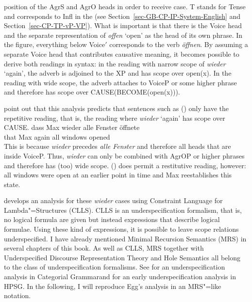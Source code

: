 position of the AgrS and AgrO heads in order to receive case.
T stands for Tense and corresponds to Infl in the \gbt (see
Section~\ref{sec-GB-CP-IP-System-English} and Section~\ref{sec-CP-TP-vP-VP}). 
What is important is that there is the Voice head and the separate representation of \emph{offen} `open' as the head of its
own phrase. In the figure, everything below Voice$'$ corresponds to the verb \emph{öffnen}. By assuming a separate Voice head that
contributes causative meaning, it becomes possible to derive both readings in syntax: in the reading with narrow scope of \emph{wieder} `again',
the adverb is adjoined to the XP and has scope over open(x). In the reading with wide scope, the adverb attaches to VoiceP or some higher phrase
and therefore has scope over CAUSE(BECOME(open(x))).

\citet{JB2003a-u} point out that this analysis predicts that sentences such as () only have the repetitive reading, that is, the reading where 
\emph{wieder} `again' has scope over CAUSE.
\ea
\label{ex-wieder-alle}
\gll dass Max wieder alle Fenster öffnete\\
     that Max again all windows opened\\
\z
This is because \emph{wieder} precedes \emph{alle Fenster} and therefore all heads that are inside VoiceP. Thus, \emph{wieder} can only
be combined with AgrOP or higher phrases and therefore has (too) wide scope. () does permit a restitutive reading, however:
all windows were open at an earlier point in time and Max reestablishes this state.

\citet{Egg99a} develops an analysis for these \emph{wieder} cases using Constraint
  Language for Lambda"=Structures (CLLS).
CLLS is an underspecification formalism, that is, no logical formula are given but instead expressions that
describe logical formulae. Using these kind of expressions, it is possible to leave scope relations underspecified. I have already mentioned Minimal Recursion
Semantics (MRS)\indexmrs \citep*{CFPS2005a} in several chapters of this book. As well as CLLS, MRS
together with Underspecified Discourse Representation Theory
  \citep{Reyle93b-u,FR95a-u} and Hole Semantics \citep{Bos96a-u,BB2005a} all belong to the class
  of underspecification formalisms. See   for an underspecification analysis in Categorial Grammar\indexcg and 
 for an early underspecification analysis in HPSG\indexhpsg. In the following, I
will reproduce Egg's analysis in an MRS"=like notation.

